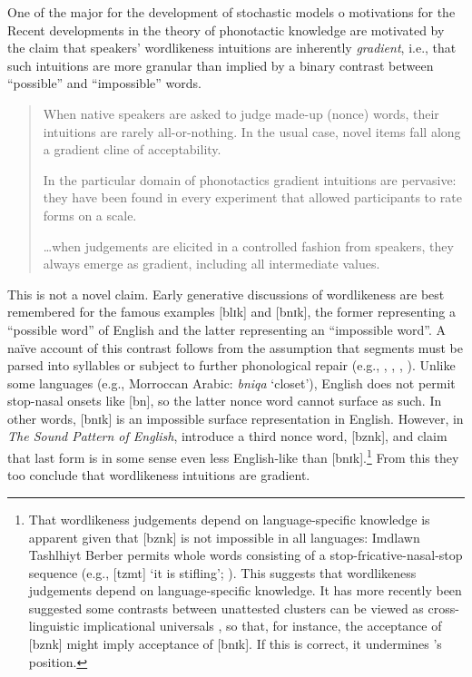 \label{gradience}

One of the major  for the development of stochastic models o
motivations for the 
Recent developments in the theory of phonotactic knowledge are motivated by the claim that speakers' wordlikeness intuitions are inherently \emph{gradient}, i.e., that such intuitions are more granular than implied by a binary contrast between ``possible'' and ``impossible'' words.

\begin{quote}
When native speakers are asked to judge made-up (nonce) words, their intuitions are rarely all-or-nothing. 
In the usual case, novel items fall along a gradient cline of acceptability. \citep[][9]{Albright2009a}

In the particular domain of phonotactics gradient intuitions are pervasive: they have been found in every experiment that allowed participants to rate forms on a scale.
\citep[][382]{Hayes2008a}

\ldots{}when judgements are elicited in a controlled fashion from speakers, they always emerge as gradient, including all intermediate values. \citep[371]{Shademan2006} 
\end{quote}

This is not a novel claim. Early generative discussions of wordlikeness \citep[e.g.,][]{Chomsky1965,Halle1962} are best remembered for the famous examples [blɪk] and [bnɪk], the former representing a ``possible word'' of English and the latter representing an ``impossible word''. 
A naïve account of this contrast follows from the assumption that segments must be parsed into syllables or subject to further phonological repair (e.g., \citealt[10f.]{Hooper1973}, \citealt[57f.]{Kahn1976}, \citealt{Ito1989a}, \citealt[19f.]{Wolf2009}). 
Unlike some languages (e.g., Morroccan Arabic: \emph{bniqa} `closet'), English does not permit stop-nasal onsets like [bn], so the latter nonce word cannot surface as such. 
In other words, [bnɪk] is an impossible surface representation in English. 
However, in \emph{The Sound Pattern of English}, \citet{SPE} introduce a third nonce word, [bznk], and claim that last form is in some sense even less English-like than [bnɪk].\footnote{
    That wordlikeness judgements depend on language-specific knowledge is apparent given that [bznk] is not impossible in all languages: Imdlawn Tashlhiyt Berber permits whole words consisting of a stop-fricative-nasal-stop sequence (e.g., [tzmt] `it is stifling'; \citealt[112]{Dell1985}). 
    This suggests that wordlikeness judgements depend on language-specific knowledge.
    It has more recently been suggested some contrasts between unattested clusters can be viewed as cross-linguistic implicational universals \citep[e.g.,][]{Berent2007a,Berent2008a,Berent2009,Berent2007b}, so that, for instance, the acceptance of [bznk] might imply acceptance of [bnɪk]. 
    If this is correct, it undermines \citeauthor{SPE}'s position.}
From this they too conclude that wordlikeness intuitions are gradient.

